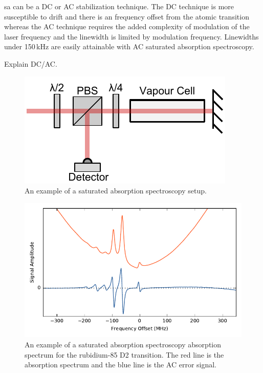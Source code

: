 \Gls{sa} can be a DC or AC stabilization technique.
The DC technique is more susceptible to drift and there is an frequency offset from the atomic transition whereas the AC technique requires the added complexity of modulation of the laser frequency and the linewidth is limited by modulation frequency.
Linewidths under 150\,kHz are easily attainable with AC saturated absorption spectroscopy.

{\color{red}Explain DC/AC.}
 
\begin{figure}
\includegraphics[width=\linewidth]{part1/Figs/SatAbs.pdf}
\caption{An example of a saturated absorption spectroscopy setup.}
\label{figure:satabs}
\end{figure}

\begin{figure}
\includegraphics[width=\linewidth]{part1/Figs/SatAbsSpectrum.pdf}
\caption{An example of a saturated absorption spectroscopy absorption spectrum for the rubidium-85 D2 transition. The red line is the absorption spectrum and the blue line is the AC error signal.}
\label{figure:satabsspectrum}
\end{figure}

